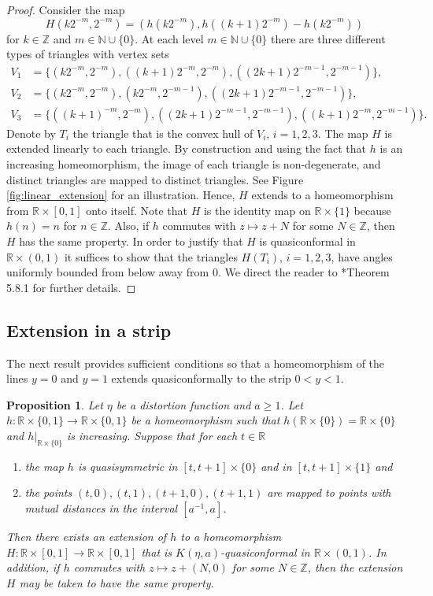 \documentclass[letterpaper]{amsart}
\theoremstyle{plain}
\newtheorem{proposition}[theorem]{Proposition}
\theoremstyle{definition}
\theoremstyle{remark}
\numberwithin{equation}{section}
\numberwithin{theorem}{section}
\newcommand{\R}{\mathbb R}
\newcommand{\Z}{\mathbb Z}
\newcommand{\N}{\mathbb N}
\begin{document}
\begin{proof}
Consider the map
$$H(k2^{-m}, 2^{-m})= (h(k2^{-m}), h((k+1)2^{-m})-h(k2^{-m}))$$
for $k\in \Z$ and $m\in \N\cup \{0\}$. At each level $m\in \N\cup \{0\}$ there are three different types of triangles with vertex sets
\begin{align*}
V_1&=\{(k2^{-m},2^{-m}), ((k+1)2^{-m}, 2^{-m}), ((2k+1)2^{-m-1}, 2^{-m-1})\},\\
V_2&= \{(k2^{-m}, 2^{-m}),(k2^{-m}, 2^{-m-1}),((2k+1)2^{-m-1}, 2^{-m-1})\},\\
V_3&= \{((k+1)^{-m},2^{-m}),((2k+1)2^{-m-1}, 2^{-m-1}),((k+1)2^{-m}, 2^{-m-1})\}.
\end{align*}
Denote by $T_i$ the triangle that is the convex hull of $V_i$, $i=1,2,3$. The map $H$ is extended linearly to each triangle. By construction and using the fact that $h$ is an increasing homeomorphism, the image of each triangle is non-degenerate, and distinct triangles are mapped to distinct triangles. See Figure \ref{fig:linear_extension} for an illustration. Hence, $H$ extends to a homeomorphism from $\R\times [0,1]$ onto itself. Note that $H$ is the identity map on $\R\times \{1\}$ because $h(n)=n$ for $n\in \Z$. Also, if $h$ commutes with $z\mapsto z+N$ for some $N\in \Z$, then $H$ has the same property. In order to justify that $H$ is quasiconformal in $\R\times (0,1)$ it suffices to show that the triangles $H(T_i)$, $i=1,2,3$, have angles uniformly bounded from below away from $0$. We direct the reader to \cite{AstalaIwaniecMartin:quasiconformal}*{Theorem 5.8.1} for further details.
\end{proof}

\subsection{Extension in a strip}
The next result provides sufficient conditions so that a homeomorphism of the lines $y=0$ and $y=1$ extends quasiconformally to the strip $0<y<1$. 

\begin{proposition}\label{theorem:extension_strip}
Let $\eta$ be a distortion function and $a\geq 1$. Let $h\colon \R\times \{0,1\}\to \R\times \{0,1\}$ be a homeomorphism such that $h(\R\times \{0\})=\R\times \{0\}$ and $h|_{\R\times \{0\}}$ is increasing. Suppose that for each $t\in \R$  
\begin{enumerate}[label=\normalfont(\arabic*)]
\item the map $h$ is quasisymmetric in $[t,t+1]\times \{0\}$ and in $[t,t+1]\times \{1\}$ and
\item the points $(t,0),(t,1),(t+1,0), (t+1,1)$ are mapped to points with mutual distances in the interval $[a^{-1},a]$.
\end{enumerate}
Then there exists an extension of $h$ to a homeomorphism $H\colon \R\times [0,1]\to \R\times [0,1]$ that is $K(\eta,a)$-quasiconformal in $\R\times (0,1)$. In addition, if $h$ commutes with $z\mapsto z+(N,0)$ for some $N\in \Z$, then the extension $H$ may be taken to have the same property.
\end{proposition}
\end{document}
